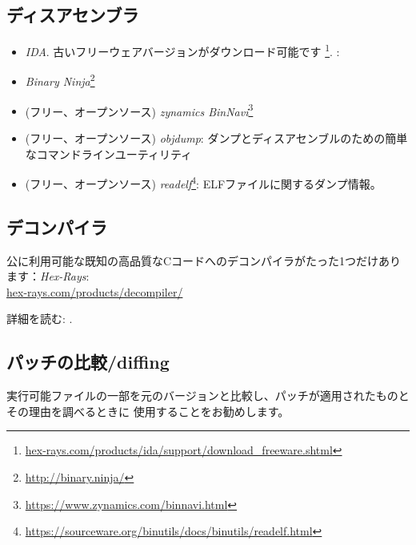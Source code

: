 \subsection{ディスアセンブラ}


\begin{itemize}
\item \emph{IDA}. 古いフリーウェアバージョンがダウンロード可能です
\footnote{\href{http://go.yurichev.com/17031}{hex-rays.com/products/ida/support/download\_freeware.shtml}}.
\ShortHotKeyCheatsheet: 


\item \emph{Binary Ninja}\footnote{\url{http://binary.ninja/}}

\item (フリー、オープンソース) \emph{zynamics BinNavi}\footnote{\url{https://www.zynamics.com/binnavi.html}}

\item (フリー、オープンソース) \emph{objdump}: ダンプとディスアセンブルのための簡単なコマンドラインユーティリティ

\item (フリー、オープンソース) \emph{readelf}\footnote{\url{https://sourceware.org/binutils/docs/binutils/readelf.html}}:
ELFファイルに関するダンプ情報。
\end{itemize}

\subsection{デコンパイラ}

公に利用可能な既知の高品質なCコードへのデコンパイラがたった1つだけあります：\emph{Hex-Rays}:\\
\href{http://go.yurichev.com/17033}{hex-rays.com/products/decompiler/}

詳細を読む: .

\subsection{パッチの比較/diffing}

実行可能ファイルの一部を元のバージョンと比較し、パッチが適用されたものとその理由を調べるときに
使用することをお勧めします。


